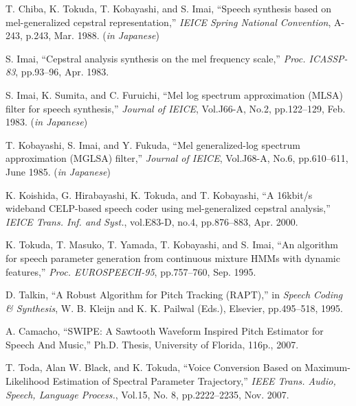 \begin{thebibliography}{99}
T. Chiba, K. Tokuda, T. Kobayashi, and S. Imai,
``Speech synthesis based on mel-generalized cepstral representation,''
{\sl IEICE Spring National Convention},
A-243, p.243, Mar. 1988. ({\sl in Japanese})

S. Imai, 
``Cepstral analysis synthesis on the mel frequency scale,''
{\sl Proc. ICASSP-83},
pp.93--96, Apr. 1983.

S. Imai, K. Sumita, and C. Furuichi,
``Mel log spectrum approximation (MLSA) filter for speech synthesis,''
{\sl Journal of IEICE},
Vol.J66-A, No.2, pp.122--129, Feb. 1983. ({\sl in Japanese})

T. Kobayashi, S. Imai, and Y. Fukuda, 
``Mel generalized-log spectrum approximation (MGLSA) filter,''
{\sl Journal of IEICE},
Vol.J68-A, No.6, pp.610--611, June 1985. ({\sl in Japanese})

K. Koishida, G. Hirabayashi, K. Tokuda, and T. Kobayashi, 
``A 16kbit/s wideband CELP-based speech coder using mel-generalized cepstral analysis,'' 
{\sl IEICE Trans. Inf. and Syst.},
vol.E83-D, no.4, pp.876--883, Apr. 2000.


K. Tokuda, T. Masuko, T. Yamada, T. Kobayashi, and S. Imai,
``An algorithm for speech parameter generation
  from continuous mixture HMMs with dynamic features,''
{\sl Proc. EUROSPEECH-95}, pp.757--760, Sep. 1995.

D. Talkin, ``A Robust Algorithm for Pitch Tracking (RAPT),''
in {\sl Speech Coding \& Synthesis}, W. B. Kleijn and K. K. Pailwal
(Eds.), Elsevier, pp.495--518, 1995.

A. Camacho, ``SWIPE: A Sawtooth Waveform Inspired Pitch Estimator for Speech And Music,''
Ph.D. Thesis, University of Florida, 116p., 2007.

T. Toda, Alan W. Black, and K. Tokuda, ``Voice Conversion Based on Maximum-Likelihood
Estimation of Spectral Parameter Trajectory,''
{\sl IEEE Trans. Audio, Speech, Language Process.},
Vol.15, No. 8, pp.2222--2235, Nov. 2007.
\end{thebibliography}
